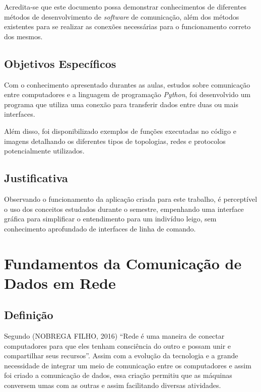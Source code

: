 \par Acredita-se que este documento possa demonstrar conhecimentos de diferentes métodos de desenvolvimento de \textit{software} de comunicação, além dos métodos existentes para se realizar as conexões necessárias para o funcionamento correto dos mesmos.

\section{\textbf{Objetivos Específicos}}
\par Com o conhecimento apresentado durantes as aulas, estudos sobre comunicação entre computadores e a linguagem de programação \textit{Python}, foi desenvolvido um programa que utiliza uma conexão para transferir dados entre duas ou mais interfaces.

\par Além disso, foi disponibilizado exemplos de funções executadas no código e imagens detalhando os diferentes tipos de topologias, redes e protocolos potencialmente utilizados.
\section{\textbf{Justificativa}}
\par Observando o funcionamento da aplicação criada para este trabalho, é perceptível o uso dos conceitos estudados durante o semestre, empenhando uma interface gráfica para simplificar o entendimento para um indivíduo leigo, sem conhecimento aprofundado de interfaces de linha de comando.


\newpage\thispagestyle{empty}
\chapter{\textbf{Fundamentos da Comunicação de Dados em Rede}}

\section{\textbf{Definição}}
\par Segundo (NOBREGA FILHO, 2016) “Rede é uma maneira de conectar computadores para que eles tenham consciência do outro e possam unir e compartilhar seus recursos”. Assim com a evolução da tecnologia e a grande necessidade de integrar um meio de comunicação entre os computadores e assim foi criado a comunicação de dados, essa criação permitiu que as máquinas conversem umas com as outras e assim facilitando diversas atividades.

